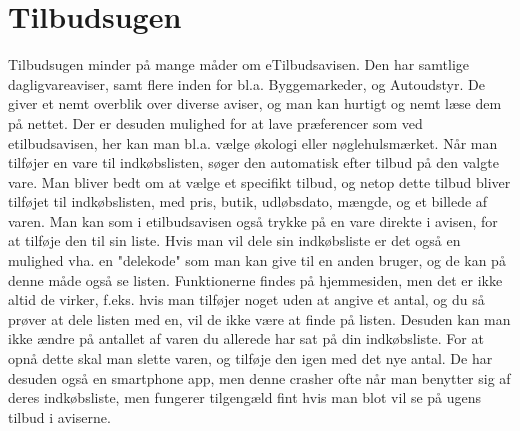 \section{Tilbudsugen}

Tilbudsugen minder på mange måder om eTilbudsavisen. 
Den har samtlige dagligvareaviser, samt flere inden for bl.a. Byggemarkeder, og Autoudstyr.
De giver et nemt overblik over diverse aviser, og man kan hurtigt og nemt læse dem på nettet. 
Der er desuden mulighed for at lave præferencer som ved etilbudsavisen, her kan man bl.a. vælge økologi eller nøglehulsmærket.
Når man tilføjer en vare til indkøbslisten, søger den automatisk efter tilbud på den valgte vare. 
Man bliver bedt om at vælge et specifikt tilbud, og netop dette tilbud bliver tilføjet til indkøbslisten, med pris, butik, udløbsdato, mængde, og et billede af varen.
Man kan som i etilbudsavisen også trykke på en vare direkte i avisen, for at tilføje den til sin liste.
Hvis man vil dele sin indkøbsliste er det også en mulighed vha. en "delekode" som man kan give til en anden bruger, og de kan på denne måde også se listen.
Funktionerne findes på hjemmesiden, men det er ikke altid de virker, f.eks. hvis man tilføjer noget uden at angive et antal, og du så prøver at dele listen med en, vil de ikke være at finde på listen.
Desuden kan man ikke ændre på antallet af varen du allerede har sat på din indkøbsliste. 
For at opnå dette skal man slette varen, og tilføje den igen med det nye antal.
De har desuden også en smartphone app, men denne crasher ofte når man benytter sig af deres indkøbsliste, men fungerer tilgengæld fint hvis man blot vil se på ugens tilbud i aviserne.


